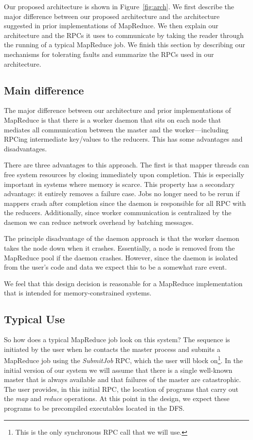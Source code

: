 \documentclass[10pt,letter,final,article,twocolumn]{article} %
\newcommand{\rpc}[1]{\emph{#1}}
\begin{document}
Our proposed architecture is shown in Figure~\ref{fig:arch}. We first describe the major difference between our proposed architecture and the architecture suggested in prior implementations of MapReduce. We then explain our architecture and the RPCs it uses to communicate by taking the reader through the running of a typical MapReduce job. We finish this section by describing our mechanisms for tolerating faults and summarize the RPCs used in our architecture.

\subsection{Main difference}

The major difference between our architecture and prior implementations of MapReduce is that there is a worker daemon that sits on each node that mediates all communication between the master and the worker---including RPCing intermediate key/values to the reducers. This has some advantages and disadvantages.

There are three advantages to this approach. The first is that mapper threads can free system resources by closing immediately upon completion. This is especially important in systems where memory is scarce. This property has a secondary advantage: it entirely removes a failure case. Jobs no longer need to be rerun if mappers crash after completion since the daemon is responsible for all RPC with the reducers. Additionally, since worker communication is centralized by the daemon we can reduce network overhead by batching messages.

The principle disadvantage of the daemon approach is that the worker daemon takes the node down when it crashes.  Essentially, a node is removed from the MapReduce pool if the daemon crashes. However, since the daemon is isolated from the user's code and data we expect this to be a somewhat rare event.

We feel that this design decision is reasonable for a MapReduce implementation that is intended for memory-constrained systems.

\subsection{Typical Use}

So how does a typical MapReduce job look on this system? The sequence is initiated by the user when he contacts the master process and submits a MapReduce job using the \rpc{SubmitJob} RPC, which the user will block on\footnote{This is the only synchronous RPC call  that we will use.}. In the initial version of our system we will assume that there is a single well-known master that is always available and that failures of the master are catastrophic. The user provides, in this initial RPC, the location of programs that carry out the \emph{map} and \emph{reduce} operations. At this point in the design, we expect these programs to be precompiled executables located in the DFS.
\end{document}
